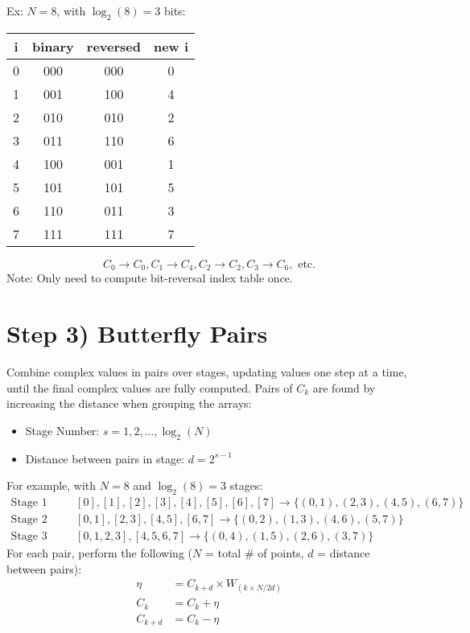 \documentclass[12pt]{article}
\begin{document}
Ex: $N=8$, with $\log_2(8)=3$ bits:
\begin{center}
\begin{tabular}{|c|c|c|c|}
\hline
i & binary & reversed & new i\\
\hline
0 & 000 & 000 & 0\\
1 & 001 & 100 & 4\\
2 & 010 & 010 & 2\\
3 & 011 & 110 & 6\\
4 & 100 & 001 & 1\\
5 & 101 & 101 & 5\\
6 & 110 & 011 & 3\\
7 & 111 & 111 & 7\\
\hline
\end{tabular}
\end{center}

\[C_0 \to C_0, C_1 \to C_4, C_2 \to C_2, C_3 \to C_6, \text{ etc.}\]
Note: Only need to compute bit-reversal index table once.

\section*{Step 3) Butterfly Pairs}
Combine complex values in pairs over stages, updating values one step at a time, until the final complex values are fully computed. Pairs of $C_k$ are found by increasing the distance when grouping the arrays:
\begin{itemize}
    \item Stage Number: $s = 1,2,\ldots,\log_2(N)$
    \item Distance between pairs in stage: $d = 2^{s-1}$
\end{itemize}

$ $\\
For example, with $N=8$ and $\log_2(8)=3$ stages:
\begin{align*}
\text{Stage 1 (distance = 1):} & \quad [0],[1],[2],[3],[4],[5],[6],[7] \to \{(0,1),(2,3),(4,5),(6,7)\}\\
\text{Stage 2 (distance = 2):} & \quad [0,1],[2,3],[4,5],[6,7] \to \{(0,2),(1,3),(4,6),(5,7)\}\\
\text{Stage 3 (distance = 4):} & \quad [0,1,2,3],[4,5,6,7] \to \{(0,4),(1,5),(2,6),(3,7)\}
\end{align*}
$ $\\
For each pair, perform the following ($N$ = total \# of points, $d$ = distance between pairs):
\begin{align*}
\eta &= C_{k+d} \times W_{(k\times N/2d)}\\
C_k &= C_k + \eta\\
C_{k+d} &= C_k - \eta
\end{align*}
\end{document}
